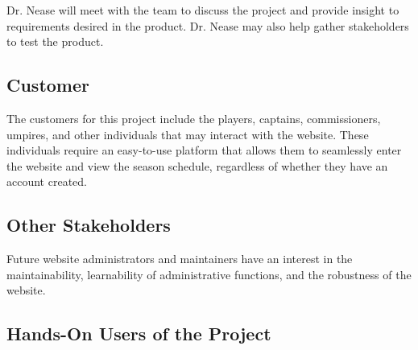 \documentclass[12pt]{article}
\begin{document}
Dr. Nease will meet with the team to discuss the project and provide insight
to requirements desired in the product. Dr. Nease may also help gather
stakeholders to test the product.

\subsection{Customer}

The customers for this project include the players, captains, commissioners,
umpires, and other individuals that may interact with the website. These
individuals require an easy-to-use platform that allows them to seamlessly
enter the website and view the season schedule, regardless of whether they have an
account created. 

\subsection{Other Stakeholders}

Future website administrators and maintainers have an interest in the
maintainability, learnability of administrative functions, and the robustness
of the website.

\subsection{Hands-On Users of the Project}
\end{document}
